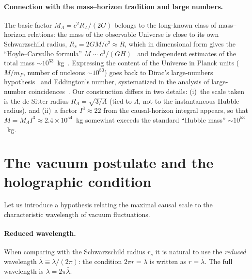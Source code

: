 \documentclass[10pt,a4paper]{article}
\begin{document}
\paragraph{Connection with the mass--horizon tradition and large numbers.} The basic factor $M_\Lambda = c^2 R_\Lambda/(2G)$ belongs to the long-known class of mass--horizon relations: the mass of the observable Universe is close to its own Schwarzschild radius, $R_s = 2GM/c^2 \approx R$, which in dimensional form gives the ``Hoyle--Carvalho formula'' $M \sim c^3/(GH)$~\cite{Carvalho1995} and independent estimates of the total mass $\sim10^{53}$~kg~\cite{Valev2014}. Expressing the content of the Universe in Planck units ($M/m_P$, number of nucleons $\sim10^{80}$) goes back to Dirac's large-numbers hypothesis~\cite{Dirac1938} and Eddington's number, systematized in the analysis of large-number coincidences~\cite{CarrRees1979}. Our construction differs in two details: (i)~the scale taken is the de Sitter radius $R_\Lambda=\sqrt{3/\Lambda}$ (tied to $\Lambda$, not to the instantaneous Hubble radius), and (ii)~a factor $I^3\approx22$ from the causal-horizon integral appears, so that $M = M_\Lambda I^3 \approx 2.4\times10^{54}$~kg somewhat exceeds the standard ``Hubble mass'' $\sim10^{53}$~kg.


\section{The vacuum postulate and the holographic condition}
\label{sec:vacuum}

Let us introduce a hypothesis relating the maximal causal scale to the characteristic wavelength of vacuum fluctuations.

\paragraph{Reduced wavelength.} When comparing with the Schwarzschild radius $r_s$ it is natural to use the \emph{reduced} wavelength $\bar\lambda \equiv \lambda/(2\pi)$: the condition $2\pi r = \lambda$ is written as $r = \bar\lambda$. The full wavelength is $\lambda = 2\pi\bar\lambda$.
\end{document}
